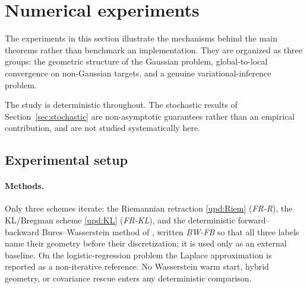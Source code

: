 %

\section{Numerical experiments}
\label{sec:numerics}

The experiments in this section illustrate the mechanisms behind the main
theorems rather than benchmark an implementation. They are organized as three
groups: the geometric structure of the Gaussian problem, global-to-local
convergence on non-Gaussian targets, and a genuine variational-inference problem.

The study is deterministic throughout. The stochastic results of
Section~\ref{sec:stochastic} are non-asymptotic guarantees rather than an
empirical contribution, and are not studied systematically here.

\subsection{Experimental setup}
\label{subsec:numerics-setup}

\paragraph{Methods.}
Only three schemes iterate: the Riemannian retraction \eqref{upd:Riem}
(\emph{FR-R}), the KL/Bregman scheme \eqref{upd:KL} (\emph{FR-KL}), and the
deterministic forward--backward Bures--Wasserstein method of
\cite{diao2023forward}, written \emph{BW-FB} so that all three labels name their
geometry before their discretization; it is used only as an external baseline. On the logistic-regression problem the Laplace approximation is
reported as a non-iterative reference. No Wasserstein warm start, hybrid
geometry, or covariance rescue enters any deterministic comparison.

